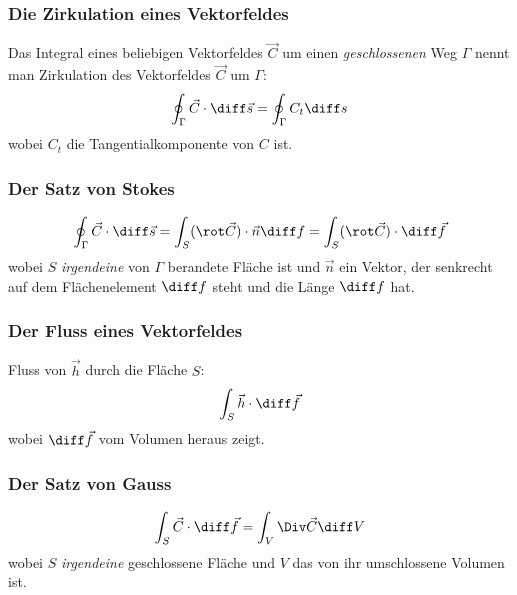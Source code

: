 		
		\subsubsection{Die Zirkulation eines Vektorfeldes} %
			
			Das Integral eines beliebigen Vektorfeldes $\vec{C}$ um einen \emph{geschlossenen} Weg $\Gamma$ nennt man Zirkulation des Vektorfeldes $\vec{C}$ um $\Gamma$:
			\[
				\oint_{\Gamma} \vec{C} \cdot \diff \vec{s} = \oint_{\Gamma} C_t \diff s
			\]
			wobei $C_t$ die Tangentialkomponente von $C$ ist.
			
		
		\subsubsection{Der Satz von Stokes} %
			
			\[
				\oint_{\Gamma} \vec{C} \cdot \diff \vec{s} = \int_S (\rot \vec{C} ) \cdot \vec{n} \diff f = \int_S (\rot \vec{C} ) \cdot \diff \vec{f}
			\]
			wobei $S$ \emph{irgendeine} von $\Gamma$ berandete Fläche ist und $\vec{n}$ ein Vektor, der senkrecht auf dem Flächenelement $\diff f$ steht und die Länge $\diff f$ hat.
			
		
		\subsubsection{Der Fluss eines Vektorfeldes} %
			
			Fluss von $\vec{h}$ durch die Fläche $S$:
			\[
				\int_S \vec{h} \cdot \diff \vec{f}
			\]
			wobei $\diff \vec{f}$ vom Volumen heraus zeigt.
			
		
		\subsubsection{Der Satz von Gauss} %
			
			\[
				\int_S \vec C \cdot \diff \vec f = \int_V \Div \vec C \diff V
			\]
			wobei $S$ \emph{irgendeine} geschlossene Fläche und $V$ das von ihr umschlossene Volumen ist.
			
		
	
